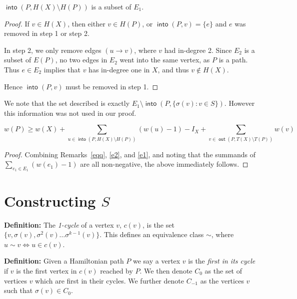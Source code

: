 \documentclass{article}
\DeclareMathOperator{\out}{\bm{\mathsf{out}}}
\DeclareMathOperator{\into}{\bm{\mathsf{into}}}
\newcommand{\dc}[1]{}%
\begin{document}
\begin{rmk}\label{e1} $\into(P,H(X)\setminus H(P))$ is a subset of $E_1$.
\begin{proof}
If $v \in H(X)$, then either $v \in H(P)$, or $\into(P,v)=\{e\}$ and $e$ was removed in step 1 or step 2.

In step 2, we only remove edges $(u\to v)$, where $v$ had in-degree 2. Since $E_2$ is a subset of $E(P)$, no two edges in $E_2$ went into the same vertex, as $P$ is a path. Thus $e \in E_2$ implies that $v$ has in-degree one in $X$, and thus $v \not \in H(X)$.

Hence $\into(P,v)$ must be removed in step 1.
\end{proof}
\end{rmk}
\noindent We note that the set described is exactly $E_1 \setminus \into(P,\{ \sigma(v): v \in S\})$. However this information was not used in our proof.

\vspace{1.75em}


\begin{lem} \label{weight rule} 

\[w(P) \geq w(X) + \sum_{u \in \into(P,H(X)\setminus H(P))} (w(u)-1) -I_X + \sum_{v \in \out(P,T(X)\setminus T(P))} w(v)\] 
\begin{proof}
Combining Remarks~\ref{eqq}, \ref{e2}, and \ref{e1}, and noting that the summands of \linebreak $\sum_{e_1\in E_1} (w(e_1)-1)$ are all non-negative, the above immediately follows.
\end{proof}

\end{lem}

\section{Constructing \texorpdfstring{$S$}{S} } \label{construction}

\dc{amsthm}
\textbf{Definition:} The \textit{1-cycle} of a vertex $v$, $c(v)$, is the set $\{v,\sigma(v),\sigma^2(v)\dots \sigma^{k-1}(v)\}$. This defines an equivalence class $\sim$, where $u \sim v \iff u \in c(v)$.

\textbf{Definition:} Given a Hamiltonian path $P$ we say a vertex $v$ is the \textit{first in its cycle} if $v$ is the first vertex in $c(v)$ reached by $P$. We then denote $C_0$ as the set of vertices $v$ which are first in their cycles. We further denote $C_{-1}$ as the vertices $v$ such that $\sigma(v) \in C_0$.
\end{document}
